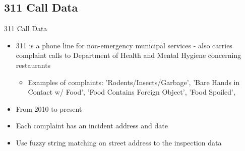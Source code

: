 \documentclass[handout]{beamer}
\begin{document}
\subsection{311 Call Data}
\begin{frame}{311 Call Data}
\begin{itemize}
\item 311 is a phone line for non-emergency municipal services - also carries complaint calls to Department of Health and Mental Hygiene concerning restaurants
\begin{itemize}
\item Examples of complaints: 'Rodents/Insects/Garbage', 'Bare Hands in Contact w/ Food', 'Food Contains Foreign Object', 'Food Spoiled', 
\end{itemize}
\item From 2010 to present
\item Each complaint has an incident address and date
\item Use fuzzy string matching on street address to the inspection data
\end{itemize}
\end{frame}
\end{document}
